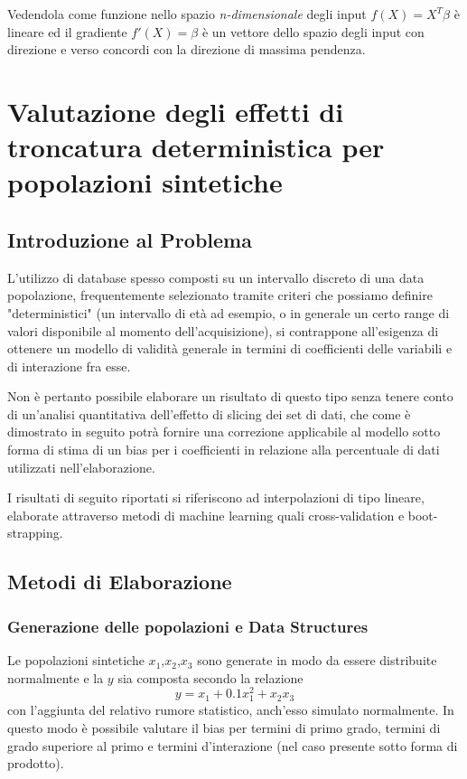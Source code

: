 \documentclass[a4paper]{report}
\begin{document}
Vedendola come funzione nello spazio \textit{n-dimensionale} degli input $f(X)=X^T\beta$ è lineare ed il gradiente $f'(X)=\beta$ è un vettore dello spazio degli input con direzione e verso concordi con la direzione di massima pendenza.









 

\chapter{Valutazione degli effetti di troncatura deterministica per popolazioni sintetiche}

\section{Introduzione al Problema}
L'utilizzo di database spesso composti su un intervallo discreto di una data popolazione, frequentemente selezionato tramite criteri che possiamo definire "deterministici" (un intervallo di età ad esempio, o in generale un certo range di valori disponibile al momento dell'acquisizione), si contrappone all'esigenza di ottenere un modello di validità generale in termini di coefficienti delle variabili e di interazione fra esse.

Non è pertanto possibile elaborare un risultato di questo tipo senza tenere conto di un'analisi quantitativa dell'effetto di slicing dei set di dati, che come è dimostrato in seguito potrà fornire una correzione applicabile al modello sotto forma di stima di un bias per i coefficienti in relazione alla percentuale di dati utilizzati nell'elaborazione.

I risultati di seguito riportati si riferiscono ad interpolazioni di tipo lineare, elaborate attraverso metodi di machine learning quali cross-validation e boot-strapping.

\section{Metodi di Elaborazione}
\subsection {Generazione delle popolazioni e Data Structures}
Le popolazioni sintetiche $x_1$,$x_2$,$x_3$ sono generate in modo da essere distribuite normalmente e la $y$ sia composta secondo la relazione \[y=x_1+0.1x_1^2+x_2x_3\]con l'aggiunta del relativo rumore statistico, anch'esso simulato normalmente.
In questo modo è possibile valutare il bias per termini di primo grado, termini di grado superiore al primo e termini d'interazione (nel caso presente sotto forma di prodotto).
\end{document}
